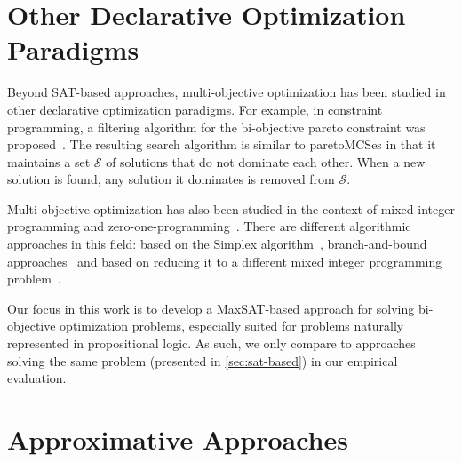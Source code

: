 \section{Other Declarative Optimization Paradigms\label{sec:other-approaches}}


Beyond SAT-based approaches, multi-objective optimization has been studied in other declarative optimization paradigms.
For example, in  constraint programming, a filtering algorithm for the bi-objective pareto constraint was proposed~\autocite{DBLP:conf/aaai/HartertS14}.
The resulting search algorithm is similar to paretoMCSes in that it maintains a set $\mathcal{S}$ of solutions that do not dominate each other.
When a new solution is found, any solution it dominates is removed from $\mathcal{S}$.

Multi-objective optimization has also been studied in the context of mixed integer programming and zero-one-programming~\autocite{Ehrgott2005-6,Rasmussen1986,DBLP:journals/eor/AlvesC07}.
There are different algorithmic approaches in this field:
based on the Simplex algorithm~\autocite{Ehrgott2005-7,DBLP:journals/mp/EvansS73}, branch-and-bound approaches~\autocite{Adelgren2021,DBLP:journals/siamjo/SantisENR20} and based on reducing it to a different mixed integer programming problem~\autocite{DBLP:journals/jota/Sun17,DBLP:journals/ol/LuMS20,Soland1979}.

Our focus in this work is to develop a MaxSAT-based approach for solving bi-objective optimization problems, especially suited for problems naturally represented in propositional logic.
As such, we only compare to approaches solving the same problem (presented in \cref{sec:sat-based}) in our empirical evaluation.

\section{Approximative Approaches\label{sec:approximative}}

\autocite{Saini2021}
